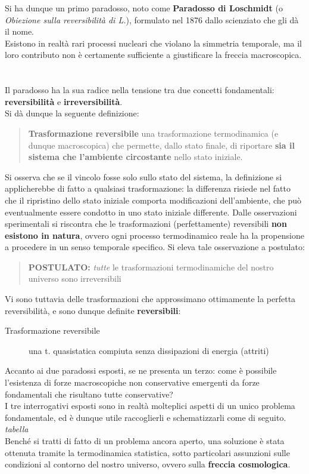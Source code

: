 \documentclass[10pt, oneside]{book}
\begin{document}
Si ha dunque un primo paradosso, noto come \textbf{Paradosso di Loschmidt} (o \textit{Obiezione sulla reversibilità di L.}), formulato nel 1876 dallo scienziato che gli dà il nome.\\
Esistono in realtà rari processi nucleari che violano la simmetria temporale, ma il loro contributo non è certamente sufficiente a giustificare la freccia macroscopica.\\
\\~\\Il paradosso ha la sua radice nella tensione tra due concetti fondamentali: \textbf{reversibilità} e \textbf{irreversibilità}.\\
Si dà dunque la seguente definizione:
\begin{quote}
\textbf{Trasformazione reversibile} una trasformazione termodinamica (e dunque macroscopica) che permette, dallo stato finale, di riportare \textbf{sia il sistema che l'ambiente circostante} nello stato iniziale.
\end{quote}
Si osserva che se il vincolo fosse solo sullo stato del sistema, la definizione si applicherebbe di fatto a qualsiasi trasformazione: la differenza risiede nel fatto che il ripristino dello stato iniziale comporta modificazioni dell'ambiente, che può eventualmente essere condotto in uno stato iniziale differente.
Dalle osservazioni sperimentali si riscontra che le trasformazioni (perfettamente) reversibili \textbf{non esistono in natura}, ovvero ogni processo termodinamico reale ha la propensione a procedere in un senso temporale specifico. Si eleva tale osservazione a postulato:
\begin{quote}
\textbf{POSTULATO:} \textit{tutte} le trasformazioni termodinamiche del nostro universo sono irreversibili
\end{quote}
Vi sono tuttavia delle trasformazioni che approssimano ottimamente la perfetta reversibilità, e sono dunque definite \textbf{reversibili}:
\begin{description}
\item[Trasformazione reversibile] una t. quasistatica compiuta senza dissipazioni di energia (attriti)
\end{description}

Accanto ai due paradossi esposti, se ne presenta un terzo: come è possibile l'esistenza di forze macroscopiche non conservative emergenti da forze fondamentali che risultano tutte conservative?\\
I tre interrogativi esposti sono in realtà molteplici aspetti di un unico problema fondamentale, ed è dunque utile raccoglierli e schematizzarli come di seguito.\\
\textit{tabella}\\
Benché si tratti di fatto di un problema ancora aperto, una soluzione è stata ottenuta tramite la termodinamica statistica, sotto particolari assunzioni sulle condizioni al contorno del nostro universo, ovvero sulla \textbf{freccia cosmologica}. 
\end{document}
